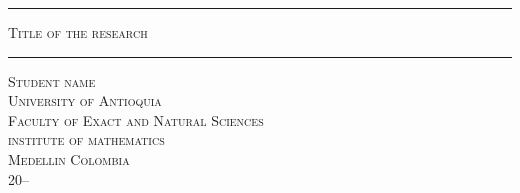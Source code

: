 \begin{center}

\vspace{1cm}
\par\noindent\rule{\textwidth}{0.4pt}
\vspace{-1mm}

\textsc{\huge Title of the research}
\vspace{1mm}

\par\noindent\rule{\textwidth}{0.4pt}

\vspace{4cm}


\large{
\textsc{Student name}
}\\[6.5cm]

\large \textsc{University of Antioquia\\
Faculty of Exact and Natural Sciences\\
institute of mathematics\\
Medellin Colombia}\\
20--\\
\end{center}

